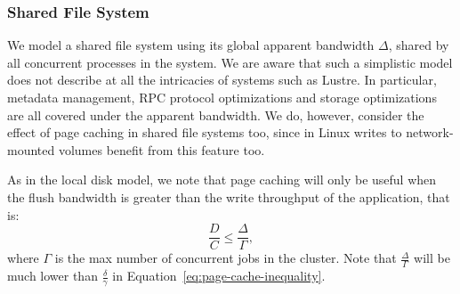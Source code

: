 \documentclass{IEEEtran}
\newcommand{\todo}[1]{\marginpar{\parbox{18mm}{\flushleft\tiny\color{red}\textbf{TODO}:
      #1}}}
\begin{document}

\todo{How about reads?}

\subsubsection{Shared File System}

We model a shared file system using its global apparent bandwidth 
$\Delta$, shared by all concurrent processes in the system. We are 
aware that such a simplistic model does not describe at all the 
intricacies of systems such as Lustre. In particular, metadata 
management, RPC protocol optimizations and storage optimizations are 
all covered under the apparent bandwidth. We do, however, consider the 
effect of page caching in shared file systems too, since in Linux 
writes to network-mounted volumes benefit from this feature too.

As in the local disk model, we note that page caching will only be 
useful when the flush bandwidth is greater than the write throughput of 
the application, that is:
\begin{equation}
\frac{D}{C} \leq \frac{\Delta}{\Gamma}, \label{eq:page-cache-sharedfs}
\end{equation}
where $\Gamma$ is the max number of concurrent jobs in the cluster. 
Note that $\frac{\Delta}{\Gamma}$ will be much lower than 
$\frac{\delta}{\gamma}$ in Equation~\ref{eq:page-cache-inequality}.     





\end{document}
